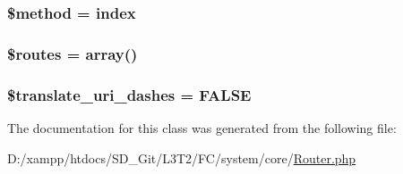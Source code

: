 \subsubsection[{\$method}]{\setlength{\rightskip}{0pt plus 5cm}\$method = \textquotesingle{}index\textquotesingle{}}\label{class_c_i___router_a12661b2fc0f57f97e30a1620889ce9c6}
\hypertarget{class_c_i___router_a8f7eb04a54e0f0bfc0cedeb9899ce4a8}{}
\subsubsection[{\$routes}]{\setlength{\rightskip}{0pt plus 5cm}\$routes = array()}\label{class_c_i___router_a8f7eb04a54e0f0bfc0cedeb9899ce4a8}
\hypertarget{class_c_i___router_a9693c124c7019ed8ec57166661044ba2}{}
\subsubsection[{\$translate\+\_\+uri\+\_\+dashes}]{\setlength{\rightskip}{0pt plus 5cm}\$translate\+\_\+uri\+\_\+dashes = F\+A\+L\+S\+E}\label{class_c_i___router_a9693c124c7019ed8ec57166661044ba2}


The documentation for this class was generated from the following file\+:\begin{DoxyCompactItemize}
\item 
D\+:/xampp/htdocs/\+S\+D\+\_\+\+Git/\+L3\+T2/\+F\+C/system/core/\hyperlink{_router_8php}{Router.\+php}\end{DoxyCompactItemize}
